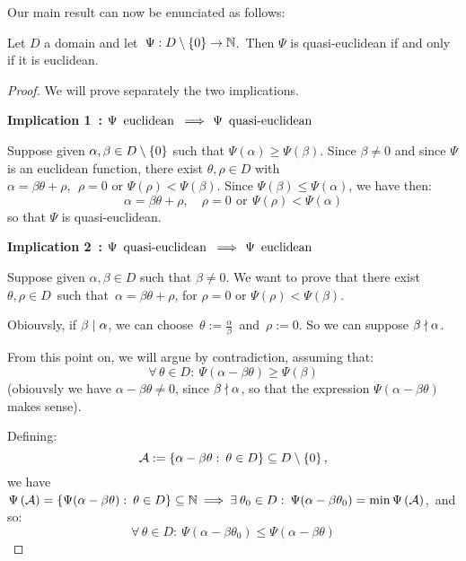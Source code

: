 \smallskip
Our main result can now be enunciated as follows:

\begin{thm}\label{euclidean_equivalent_quasi-euclidean}
Let $D$ a domain and let \,$\Psi: D\setminus\left\{0\right\} \rightarrow \mathbb{N}$.\,
Then $\Psi$ is quasi-euclidean if and only if it is euclidean.
\end{thm}

\begin{proof}
%
We will prove separately the two implications.

\smallskip
\textbf{Implication 1~:}\:
$\Psi\,\text{ euclidean } \:\Longrightarrow\:\, \Psi\,\text{ quasi-euclidean}$

Suppose given $\alpha, \beta \in D\setminus\left\{0\right\}$ such
that $\Psi(\alpha) \geq \Psi(\beta)$. Since $\beta \ne 0$
and since $\Psi$ is an euclidean function, there exist
$\theta, \rho \in D$ with $\alpha = \beta \theta + \rho,\ \:
\rho = 0 \textrm{\ or\ } \Psi(\rho) < \Psi(\beta)$.
Since $\Psi(\beta) \leq \Psi(\alpha)$, we have then:
$$
\alpha = \beta\theta + \rho, \quad\! \rho = 0
\ \,\textrm{or}\ \, \Psi(\rho) < \Psi(\alpha)
$$
so that $\Psi$ is quasi-euclidean.

\medskip
\textbf{Implication 2~:}\:
$\Psi\,\text{ quasi-euclidean }\:\Longrightarrow\:\, \Psi\,\text{ euclidean}$

Suppose given $\alpha, \beta \in D$ such that $\beta \ne 0$.
We want to prove that there exist\, $\theta, \rho \in D$\, such that\,
$\alpha = \beta \theta + \rho$, for $\rho = 0$ or
$\Psi(\rho) < \Psi(\beta)$.

Obiouvsly, if $\beta \mid \alpha$, we can choose
\,$\theta:= \frac{\alpha}{\beta}$\, and\, $\rho:= 0$.
So we can suppose $\beta \nmid \alpha$.

From this point on, we will argue by contradiction,
assuming that:
\begin{equation}\label{violation_of_norm-euclidean}
\forall\, \theta \in D:\:
\Psi(\alpha - \beta\theta) \geq \Psi(\beta)
\end{equation}
(obiouvsly we have $\alpha - \beta\theta \ne 0$, since
$\beta \nmid \alpha$, so that the expression
$\Psi(\alpha - \beta\theta)$ makes sense).

Defining:
$$
\mathcal{A}:= \left\{\alpha - \beta\theta:\: \theta \in D
\right\}  \subseteq D\setminus\left\{0\right\},
$$
we have\,
$\Psi\left(\mathcal{A}\right) =
\left\{\Psi(\alpha - \beta\theta):
\:\theta \in D \right\}
\subseteq \mathbb{N} \:\Longrightarrow\: \exists\: \theta_0 \in D:\:
\Psi(\alpha - \beta\theta_0) =
\min \Psi\left(\mathcal{A}\right)$,\,
%
and so:
%
\begin{equation}\label{theta0_minimality}
\forall\, \theta \in D:\:
\Psi(\alpha - \beta\theta_0) \leq 
\Psi(\alpha - \beta\theta)
\end{equation}
%


\end{proof}
